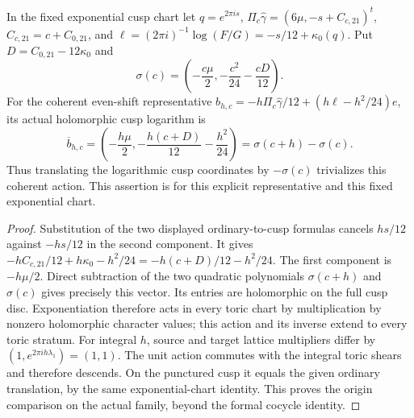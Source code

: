 \begin{lemma}
\label{mapsaudit:coherent-cusp-origin}
In the fixed exponential cusp chart let $q=e^{2\pi i s}$,
$\Pi_c\widehat\gamma=(6\mu,-s+C_{c,21})^t$,
$C_{c,21}=c+C_{0,21}$, and
$\ell=(2\pi i)^{-1}\log(F/G)=-s/12+\kappa_0(q)$.
Put $D=C_{0,21}-12\kappa_0$ and
\[
 \sigma(c)=\left(-\frac{c\mu}{2},-\frac{c^2}{24}-\frac{cD}{12}\right).
\]
For the coherent even-shift representative
$b_{h,c}=-h\Pi_c\widehat\gamma/12+(h\ell-h^2/24)e$,
its actual holomorphic cusp logarithm is
\[
 \overline b_{h,c}
 =\left(-\frac{h\mu}{2},-\frac{h(c+D)}{12}-\frac{h^2}{24}\right)
 =\sigma(c+h)-\sigma(c).
\]
Thus translating the logarithmic cusp coordinates by $-\sigma(c)$
trivializes this coherent action. This assertion is for this explicit
representative and this fixed exponential chart.
\end{lemma}
\begin{proof}
Substitution of the two displayed ordinary-to-cusp formulas cancels
$hs/12$ against $-hs/12$ in the second component. It gives
$-hC_{c,21}/12+h\kappa_0-h^2/24=-h(c+D)/12-h^2/24$.
The first component is $-h\mu/2$. Direct subtraction of the two
quadratic polynomials $\sigma(c+h)$ and $\sigma(c)$ gives precisely
this vector. Its entries are holomorphic on the full cusp disc.
Exponentiation therefore acts in every toric chart by multiplication
by nonzero holomorphic character values; this action and its inverse
extend to every toric stratum. For integral $h$, source and target
lattice multipliers differ by $(1,e^{2\pi i h\lambda_1})=(1,1)$.
The unit action commutes with the integral toric shears and therefore
descends. On the punctured cusp it equals the given ordinary translation,
by the same exponential-chart identity. This proves the origin comparison
on the actual family, beyond the formal cocycle identity.
\end{proof}
